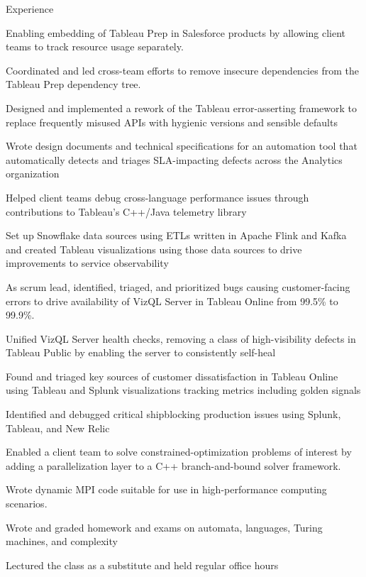 \documentclass{cv}
\begin{document}

\begin{cvsection}{Experience}
  {
    \item Enabling embedding of Tableau Prep in Salesforce products by allowing client teams to track resource usage separately.
    \item Coordinated and led cross-team efforts to remove insecure dependencies from the Tableau Prep dependency tree.
    \item Designed and implemented a rework of the Tableau error-asserting framework to replace frequently misused APIs with hygienic versions and sensible defaults
    \item Wrote design documents and technical specifications for an automation tool that automatically detects and triages SLA-impacting defects across the Analytics organization
    \item Helped client teams debug cross-language performance issues through contributions to Tableau's C++/Java telemetry library
    \item Set up Snowflake data sources using ETLs written in Apache Flink and Kafka and created Tableau visualizations using those data sources to drive improvements to service observability
    \item As scrum lead, identified, triaged, and prioritized bugs causing customer-facing errors to drive availability of VizQL Server in Tableau Online from 99.5\% to 99.9\%.
    \item Unified VizQL Server health checks, removing a class of high-visibility defects in Tableau Public by enabling the server to consistently self-heal
    \item Found and triaged key sources of customer dissatisfaction in Tableau Online using Tableau and Splunk visualizations tracking metrics including golden signals
    \item Identified and debugged critical shipblocking production issues using Splunk, Tableau, and New Relic
  }
  {
    \item Enabled a client team to solve constrained-optimization problems of interest by adding a parallelization layer to a C++ branch-and-bound solver framework.
    \item Wrote dynamic MPI code suitable for use in high-performance computing scenarios.
  }
  {
    \item Wrote and graded homework and exams on automata, languages, Turing machines, and complexity
    \item Lectured the class as a substitute and held regular office hours
  }
\end{cvsection}
\end{document}
